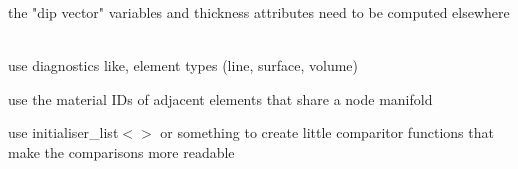 \begin{DoxyRefList}
\label{todo__todo000029}%
%
the "{}dip vector"{} variables and thickness attributes need to be computed elsewhere  
\item[Member \doxylink{namespacecsmp_a82f94771885b8a2a53898e22fe91e492}{csmp\+::consistency\+Check} (const \doxylink{classcsmp_1_1_node_manifold}{Node\+Manifold$<$ dim $>$} \&, bool verbose)]\hfill \\
\label{todo__todo000174}%
%
use diagnostics like, element types (line, surface, volume) 



use the material IDs of adjacent elements that share a node manifold 



use initialiser\+\_\+list$<$$>$ or something to create little comparitor functions that make the comparisons more readable 




\end{DoxyRefList}
